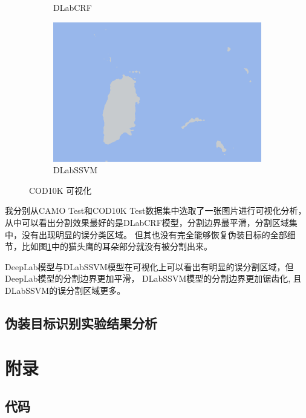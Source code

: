 \documentclass[a4paper,12pt]{ctexart}
\begin{document}
\begin{figure}[h]
\begin{subfigure}{0.25\textwidth}
        \caption{DLabCRF}
    \end{subfigure}%
    \hfill
    \begin{subfigure}{0.25\textwidth}
        \centering
        \includegraphics[width=\linewidth]{figures/COD10K_demo1/COD10K_demo1_pred_dlap.png}
        \caption{DLabSSVM}
    \end{subfigure}
    
    \caption{COD10K 可视化 \label{fig:COD10K_demo1}}
\end{figure}

我分别从CAMO Test和COD10K Test数据集中选取了一张图片进行可视化分析，从中可以看出分割效果最好的是DLabCRF模型，分割边界最平滑，分割区域集中，没有出现明显的误分类区域。
但其也没有完全能够恢复伪装目标的全部细节，比如图\ref{fig:COD10K_demo1}中的猫头鹰的耳朵部分就没有被分割出来。

DeepLab模型与DLabSSVM模型在可视化上可以看出有明显的误分割区域，但DeepLab模型的分割边界更加平滑，
DLabSSVM模型的分割边界更加锯齿化, 且DLabSSVM的误分割区域更多。


\subsection{伪装目标识别实验结果分析}



\section{附录}
\subsection{代码}




\end{document}
